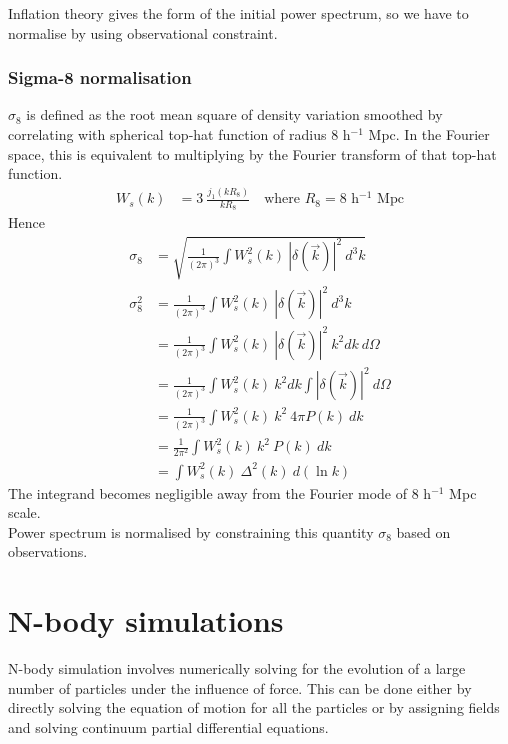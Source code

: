 \documentclass[12pt]{article}
\begin{document}
\noindent
Inflation theory gives the form of the initial power spectrum, so we have to normalise by using observational constraint.
\subsubsection*{Sigma-8 normalisation}
$\sigma_8$ is defined as the root mean square of density variation smoothed by correlating with spherical top-hat function of radius 8 h$^{-1}$ Mpc. In the Fourier space, this is equivalent to multiplying by the Fourier transform of that top-hat function.
\begin{align}
W_s(k) &= 3 ~\frac{j_1(k R_8)}{k R_8} \quad \text{where } R_8 = 8 \text{ h$^{-1}$ Mpc}
\end{align}
Hence
\begin{align}
\sigma_8 &= \sqrt{ \frac{1}{(2 \pi)^3} \int W_s^2(k) ~|\delta (\vec{k})|^2 ~d^3k}\\
\sigma_8^2 &=  \frac{1}{(2 \pi)^3} \int W_s^2(k) ~|\delta (\vec{k})|^2 ~d^3k\\
&= \frac{1}{(2 \pi)^3} \int W_s^2(k) ~|\delta (\vec{k})|^2 ~k^2 dk ~d\Omega\\
&= \frac{1}{(2 \pi)^3} \int W_s^2(k) ~k^2 dk \int |\delta (\vec{k})|^2  ~d\Omega\\
&= \frac{1}{(2 \pi)^3} \int W_s^2(k) ~k^2 ~4\pi P(k) ~dk\\
&= \frac{1}{2 \pi^2} \int W_s^2(k) ~k^2 ~P(k) ~dk\\
&= \int W_s^2(k) ~\Delta^2(k) ~d(\ln k)
\end{align}
%
The integrand becomes negligible away from the Fourier mode of 8 h$^{-1}$ Mpc scale.\\
Power spectrum is normalised by constraining this quantity $\sigma_8$ based on observations.


\section{N-body simulations}
\label{sec:N-body-simulations}
N-body simulation involves numerically solving for the evolution of a large number of particles under the influence of force. This can be done either by directly solving the equation of motion for all the particles or by assigning fields and solving continuum partial differential equations.\\
\end{document}
